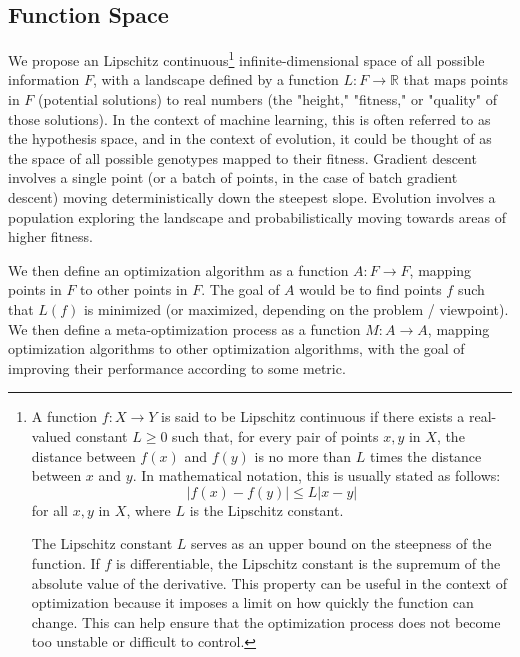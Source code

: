 \documentclass{article}[10pt]
\begin{document}
\subsection{Function Space}
\label{subsection:functionSpace}
We propose an Lipschitz continuous\footnote{
    A function \( f: X \rightarrow Y \) is said to be Lipschitz continuous if there exists a real-valued constant \( L \geq 0 \) such that, for every pair of points \( x, y \) in \( X \), the distance between \( f(x) \) and \( f(y) \) is no more than \( L \) times the distance between \( x \) and \( y \).
    In mathematical notation, this is usually stated as follows:
    \[|f(x) - f(y)| \leq L|x - y|\]
    for all \( x, y \) in \( X \), where \( L \) is the Lipschitz constant.\par
    
    The Lipschitz constant \( L \) serves as an upper bound on the steepness of the function. 
    If \( f \) is differentiable, the Lipschitz constant is the supremum of the absolute value of the derivative.
    This property can be useful in the context of optimization because it imposes a limit on how quickly the function can change. 
    This can help ensure that the optimization process does not become too unstable or difficult to control.
} 
infinite-dimensional space of all possible information $F$, with a landscape defined by a function \(L: F \rightarrow \mathbb{R}\) that maps points in \(F\) (potential solutions) to real numbers (the "height," "fitness," or "quality" of those solutions).
In the context of machine learning, this is often referred to as the hypothesis space, and in the context of evolution, it could be thought of as the space of all possible genotypes mapped to their fitness.
Gradient descent involves a single point (or a batch of points, in the case of batch gradient descent) moving deterministically down the steepest slope.
Evolution involves a population exploring the landscape and probabilistically moving towards areas of higher fitness. \par


We then define an optimization algorithm as a function \( A: F \rightarrow F \), mapping points in \( F \) to other points in \( F \). 
The goal of \( A \) would be to find points \( f \) such that \( L(f) \) is minimized (or maximized, depending on the problem / viewpoint).
We then define a meta-optimization process as a function \( M: A \rightarrow A \), mapping optimization algorithms to other optimization algorithms, with the goal of improving their performance according to some metric.\par
\end{document}
